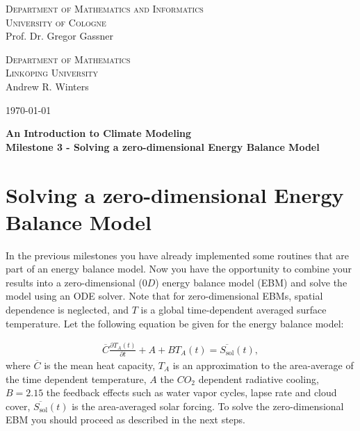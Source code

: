 \documentclass[10pt]{scrartcl}
\begin{document}
\begin{minipage}{.5\textwidth}
{\scshape Department of Mathematics and Informatics \\
University of Cologne\\}
\small Prof. Dr. Gregor Gassner \\
\end{minipage}
\begin{minipage}{.3\textwidth}
{\scshape Department of Mathematics \\
Link\"{o}ping University\\}
\small Andrew R. Winters \\
\end{minipage}
\hfill
\begin{minipage}{.15\textwidth}
\begin{flushright}
\today
\end{flushright}
\end{minipage}

\begin{center}
{\Large\bfseries
An Introduction to Climate Modeling}\\
\vspace{0.2cm}
{\bfseries Milestone 3 - Solving a zero-dimensional Energy Balance Model}
\end{center}


\section{Solving a zero-dimensional Energy Balance Model}


In the previous milestones you have already implemented some routines that are part of an energy balance model. Now you have the opportunity to combine your results into a zero-dimensional ($0D$) energy balance model (EBM) and solve the model using an ODE solver. Note that for zero-dimensional EBMs, spatial dependence is neglected, and $T$ is a global time-dependent averaged surface temperature. Let the following equation be given for the energy balance model:

\begin{align}
\overline{C}\frac{\partial {T}_A(t)}{\partial t}+A+B{T}_A(t)=\overline{S_\text{sol}}(t),
\label{EBM}
\end{align}
where $\overline{C}$ is the mean heat capacity, ${T}_A$ is an approximation to the area-average of the time dependent temperature, $A$ the $CO_2$ dependent radiative cooling, $B = 2.15$ the feedback effects such as water vapor cycles, lapse rate and cloud cover, $\overline{S_\text{sol}}(t)$ is the area-averaged solar forcing.
To solve the zero-dimensional EBM you should proceed as described in the next steps.
\end{document}
